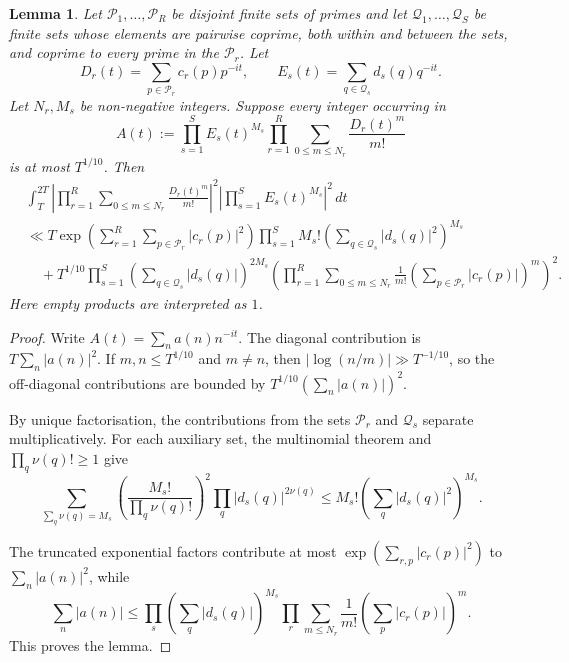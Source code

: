 \documentclass[twoside,reqno,11pt,a4paper]{amsart}
\numberwithin{equation}{section}
\theoremstyle{plain}
\newtheorem{lem}[thm]{Lemma}
\theoremstyle{definition}
\theoremstyle{remark}
\renewcommand{\le}{\leqslant}
\renewcommand{\ge}{\geqslant}
\begin{document}
    
\begin{lem}\label{complex-dirichlet-mean}
Let $\mathcal P_1,\ldots,\mathcal P_R$ be disjoint finite sets of primes and
let $\mathcal Q_1,\ldots,\mathcal Q_S$ be finite sets whose elements are
pairwise coprime, both within and between the sets, and coprime to every prime
in the $\mathcal P_r$.  Let
\begin{equation*}
D_r(t)=\sum_{p\in\mathcal P_r}c_r(p)p^{-it},\qquad
E_s(t)=\sum_{q\in\mathcal Q_s}d_s(q)q^{-it}.
\end{equation*}
Let $N_r,M_s$ be non-negative integers.  Suppose every integer occurring in
\begin{equation*}
 A(t):=\prod_{s=1}^S E_s(t)^{M_s}
 \prod_{r=1}^R\sum_{0\le m\le N_r}\frac{D_r(t)^m}{m!}
\end{equation*}
is at most $T^{1/10}$.  Then    
        \begin{align*}
         &\int_T^{2T}
        \left|\prod_{r=1}^{R}\sum_{0\le  m\le  N_r}\frac{D_r(t)^m}{m!}\right|^2
        \left|\prod_{s=1}^S E_s(t)^{M_s} \right|^2\,dt \\
&\ll T\exp\left(\sum_{r=1}^R\sum_{p\in\mathcal P_r}|c_r(p)|^2\right)
 \prod_{s=1}^S M_s!\left(\sum_{q\in\mathcal Q_s}|d_s(q)|^2\right)^{M_s}\\
&\quad+T^{1/10}
 \prod_{s=1}^S\left(\sum_{q\in\mathcal Q_s}|d_s(q)|\right)^{2M_s}
 \left(\prod_{r=1}^R\sum_{0\le m\le N_r}\frac1{m!}
 \left(\sum_{p\in\mathcal P_r}|c_r(p)|\right)^m\right)^2.
\end{align*}
Here empty products are interpreted as $1$.
\end{lem}
\begin{proof}
Write $A(t)=\sum_na(n)n^{-it}$. 
The diagonal contribution is $T\sum_n|a(n)|^2$.  If $m,n\le T^{1/10}$ and
$m\ne n$, then $|\log(n/m)|\gg T^{-1/10}$, so the off-diagonal contributions are
bounded by $T^{1/10}(\sum_n|a(n)|)^2$.

By unique factorisation, the contributions from the sets $\mathcal P_r$ and $\mathcal Q_s$ separate multiplicatively. For each auxiliary set, the multinomial theorem and
$\prod_q\nu(q)!\ge1$ give
\begin{equation*}
 \sum_{\sum_q\nu(q)=M_s}
 \left(\frac{M_s!}{\prod_q\nu(q)!}\right)^2
 \prod_q|d_s(q)|^{2\nu(q)}
 \le M_s!\left(\sum_q|d_s(q)|^2\right)^{M_s}.
\end{equation*}

The truncated exponential factors contribute at most
$\exp(\sum_{r,p}|c_r(p)|^2)$ to $\sum_n|a(n)|^2$, while
\begin{equation*}
 \sum_n|a(n)|\le
 \prod_s\left(\sum_q|d_s(q)|\right)^{M_s}
 \prod_r\sum_{m\le N_r}\frac1{m!}
 \left(\sum_p|c_r(p)|\right)^m.
\end{equation*}
 This proves the lemma.
\end{proof}
\end{document}
